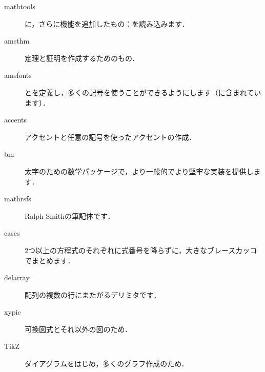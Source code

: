 \begin{description}
\item[mathtools] に，さらに機能を追加したもの：を読み込みます．
\item[amsthm] 定理と証明を作成するためのもの．
\item[amsfonts] とを定義し，多くの記号を使うことができるようにします（に含まれています）．
\item[accents] アクセントと任意の記号を使ったアクセントの作成．
\item[bm] 太字のための数学パッケージで，より一般的でより堅牢な実装を提供します．
\item[mathrsfs] Ralph Smithの筆記体です．
\item[cases] 2つ以上の方程式のそれぞれに式番号を降らずに，大きなブレースカッコでまとめます．
\item[delarray] 配列の複数の行にまたがるデリミタです．
\item[xypic] 可換図式とそれ以外の図のため．
\item[TikZ] ダイアグラムをはじめ，多くのグラフ作成のため．
\end{description}

